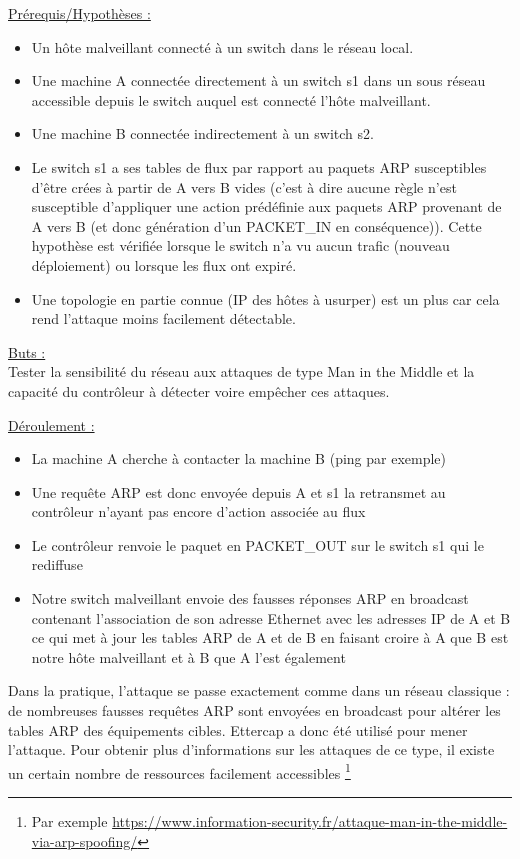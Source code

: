 \underline{Prérequis/Hypothèses :}

\begin{itemize}

\item Un hôte malveillant connecté à un switch dans le réseau local.
\item Une machine A connectée directement à un switch s1 dans un sous réseau accessible depuis le switch auquel est connecté l'hôte malveillant.
\item Une machine B connectée indirectement à un switch s2.
\item Le switch s1 a ses tables de flux par rapport au paquets ARP susceptibles d’être crées à partir de A vers B vides (c’est à dire aucune règle n’est susceptible d’appliquer une action prédéfinie aux paquets ARP provenant de A vers B (et donc génération d’un PACKET\_IN en conséquence)). Cette hypothèse est vérifiée lorsque le switch n'a vu aucun trafic (nouveau déploiement) ou lorsque les flux ont expiré.
\item Une topologie en partie connue (IP des hôtes à usurper) est un plus car cela rend l'attaque moins facilement détectable.

\end{itemize}

\underline{Buts :}\\
Tester la sensibilité du réseau aux attaques de type Man in the Middle et la capacité du contrôleur à détecter voire empêcher ces attaques.

\underline{Déroulement :}

\begin{itemize}

\item La machine A cherche à contacter la machine B (ping par exemple)
\item Une requête ARP est donc envoyée depuis A et s1 la retransmet au contrôleur n’ayant pas encore d’action associée au flux
\item Le contrôleur renvoie le paquet en PACKET\_OUT sur le switch s1 qui le rediffuse
\item Notre switch malveillant envoie des fausses réponses ARP en broadcast contenant l'association de son adresse Ethernet avec les adresses IP de A et B ce qui met à jour les tables ARP de A et de B en faisant croire à A que B est notre hôte malveillant et à B que A l'est également

\end{itemize}

Dans la pratique, l'attaque se passe exactement comme dans un réseau classique : de nombreuses fausses requêtes ARP sont envoyées en broadcast pour altérer les tables ARP des équipements cibles. Ettercap a donc été utilisé pour mener l'attaque. Pour obtenir plus d'informations sur les attaques de ce type, il existe un certain nombre de ressources facilement accessibles \footnote{Par exemple \url{https://www.information-security.fr/attaque-man-in-the-middle-via-arp-spoofing/}}

